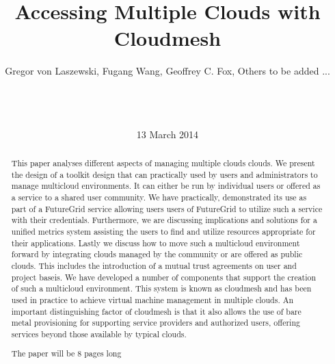 \documentclass{tex/sig-alternate}
\newcommand{\TITLE}{Accessing Multiple  Clouds with Cloudmesh}
\begin{document}
 
% 
 
\title{\TITLE} 
 
\author{ 
\alignauthor 
Gregor von Laszewski, 
Fugang Wang, 
Geoffrey C. Fox, 
Others to be added ...  \\
       \\
       \\
       \\ 
} 
\date{13 March 2014} 
 
\toappear{} 
\maketitle 
\begin{abstract} 

  This paper analyses different aspects of managing multiple clouds
  clouds. We present the design of a toolkit design that can
  practically used by users and administrators to manage multicloud
  environments.  It can either be run by individual users or offered
  as a service to a shared user community. We have practically,
  demonstrated its use as part of a FutureGrid service allowing users
  users of FutureGrid to utilize such a service with their
  credentials. Furthermore, we are discussing implications and
  solutions for a unified metrics system assisting the users to find
  and utilize resources appropriate for their applications. Lastly we
  discuss how to move such a multicloud environment forward by
  integrating clouds managed by the community or are offered as public
  clouds. This includes the introduction of a mutual trust agreements
  on user and project baseis. We have developed a number of components
  that support the creation of such a multicloud environment. This
  system is known as cloudmesh and has been used in practice to
  achieve virtual machine management in multiple clouds. An important
  distinguishing factor of cloudmesh is that it also allows the use of
  bare metal provisioning for supporting service providers and
  authorized users, offering services beyond those available by
  typical clouds.

  The paper will be 8 pages long 
 
\end{abstract} 
 
\end{document}
